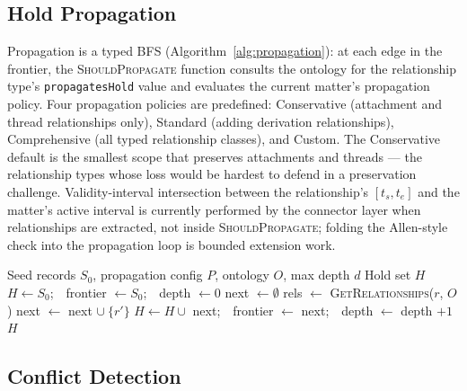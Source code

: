 \documentclass{ieeeaccess}
\begin{document}
\subsection{Hold Propagation}

Propagation is a typed BFS (Algorithm~\ref{alg:propagation}): at each edge in the frontier, the \textsc{ShouldPropagate} function consults the ontology for the relationship type's \texttt{propagatesHold} value and evaluates the current matter's propagation policy. Four propagation policies are predefined: Conservative (attachment and thread relationships only), Standard (adding derivation relationships), Comprehensive (all typed relationship classes), and Custom. The Conservative default is the smallest scope that preserves attachments and threads — the relationship types whose loss would be hardest to defend in a preservation challenge. Validity-interval intersection between the relationship's $[t_s, t_e]$ and the matter's active interval is currently performed by the connector layer when relationships are extracted, not inside \textsc{ShouldPropagate}; folding the Allen-style~\cite{allen1983} check into the propagation loop is bounded extension work.

\begin{algorithm}[t]
\caption{Semantic Hold Propagation}
\label{alg:propagation}
\begin{algorithmic}[1]
\Require Seed records $S_0$, propagation config $P$, ontology $O$, max depth $d$
\Ensure Hold set $H$
\State $H \gets S_0$;\ \ frontier $\gets S_0$;\ \ depth $\gets 0$
    \State next $\gets \emptyset$
        \State rels $\gets$ \textsc{GetRelationships}($r$, $O$)
                \State next $\gets$ next $\cup\ \{r'\}$
            \EndIf
        \EndFor
    \EndFor
    \State $H \gets H \cup$ next;\ \ frontier $\gets$ next;\ \ depth $\gets$ depth $+ 1$
\EndWhile
\State \Return $H$
\end{algorithmic}
\end{algorithm}

\subsection{Conflict Detection}
\end{document}
